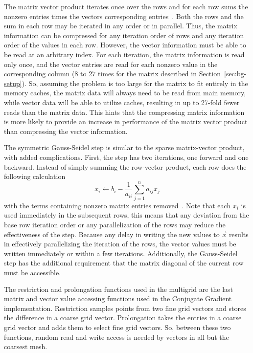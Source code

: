 The matrix vector product iterates once over the rows and for each row sums the nonzero entries times the vectors corresponding entries~\cite{Dongarra:2015:HPCG}.
Both the rows and the sum in each row may be iterated in any order or in parallel.
Thus, the matrix information can be compressed for any iteration order of rows and any iteration order of the values in each row.
However, the vector information must be able to be read at an arbitrary index.
For each iteration, the matrix information is read only once, and the vector entries are read for each nonzero value in the corresponding column (8 to 27 times for the matrix described in Section~\ref{sec:bg-setup}).
So, assuming the problem is too large for the matrix to fit entirely in the memory caches, the matrix data will always need to be read from main memory, while vector data will be able to utilize caches, resulting in up to 27-fold fewer reads than the matrix data.
This hints that the compressing matrix information is more likely to provide an increase in performance of the matrix vector product than compressing the vector information.

The symmetric Gauss-Seidel step is similar to the sparse matrix-vector product, with added complications.
First, the step has two iterations, one forward and one backward.
Instead of simply summing the row-vector product, each row does the following calculation
\[
	x_i \gets b_i - \frac{1}{a_{ii}}\sum_{j=1}^{n}a_{ij}x_j
\]
with the terms containing nonzero matrix entries removed~\cite{Dongarra:2015:HPCG}.
Note that each \(x_i\) is used immediately in the subsequent rows, this means that any deviation from the base row iteration order or any parallelization of the rows may reduce the effectiveness of the step.
Because any delay in writing the new values to \(\vec{x}\) results in effectively parallelizing the iteration of the rows, the vector values must be written immediately or within a few iterations.
Additionally, the Gauss-Seidel step has the additional requirement that the matrix diagonal of the current row must be accessible.

The restriction and prolongation functions used in the multigrid are the last matrix and vector value accessing functions used in the Conjugate Gradient implementation.
Restriction samples points from two fine grid vectors and stores the difference in a coarse grid vector.
Prolongation takes the entries in a coarse grid vector and adds them to select fine grid vectors.
So, between these two functions, random read and write access is needed by vectors in all but the coarsest mesh.

